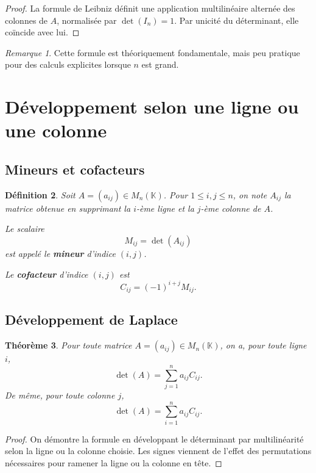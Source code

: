 \documentclass[11pt,a4paper]{article}
\newtheorem{definition}{Définition}[section]
\newtheorem{theoreme}[definition]{Théorème}
\theoremstyle{remark}
\newtheorem{remarque}[definition]{Remarque}
\newcommand{\K}{\mathbb{K}}
\begin{document}
\begin{proof}
La formule de Leibniz définit une application multilinéaire alternée des colonnes de \(A\), normalisée par \(\det(I_n)=1\). Par unicité du déterminant, elle coïncide avec lui.
\end{proof}

\begin{remarque}
Cette formule est théoriquement fondamentale, mais peu pratique pour des calculs explicites lorsque \(n\) est grand.
\end{remarque}

\section{Développement selon une ligne ou une colonne}

\subsection{Mineurs et cofacteurs}

\begin{definition}
Soit \(A=(a_{ij})\in M_n(\K)\).  
Pour \(1\le i,j\le n\), on note \(A_{ij}\) la matrice obtenue en supprimant la \(i\)-ème ligne et la \(j\)-ème colonne de \(A\).

Le scalaire
\[
M_{ij}=\det(A_{ij})
\]
est appelé le \textbf{mineur} d’indice \((i,j)\).

Le \textbf{cofacteur} d’indice \((i,j)\) est
\[
C_{ij}=(-1)^{i+j}M_{ij}.
\]
\end{definition}

\subsection{Développement de Laplace}

\begin{theoreme}
Pour toute matrice \(A=(a_{ij})\in M_n(\K)\), on a, pour toute ligne \(i\),
\[
\det(A)=\sum_{j=1}^n a_{ij}C_{ij}.
\]
De même, pour toute colonne \(j\),
\[
\det(A)=\sum_{i=1}^n a_{ij}C_{ij}.
\]
\end{theoreme}

\begin{proof}
On démontre la formule en développant le déterminant par multilinéarité selon la ligne ou la colonne choisie. Les signes viennent de l’effet des permutations nécessaires pour ramener la ligne ou la colonne en tête.
\end{proof}
\end{document}
